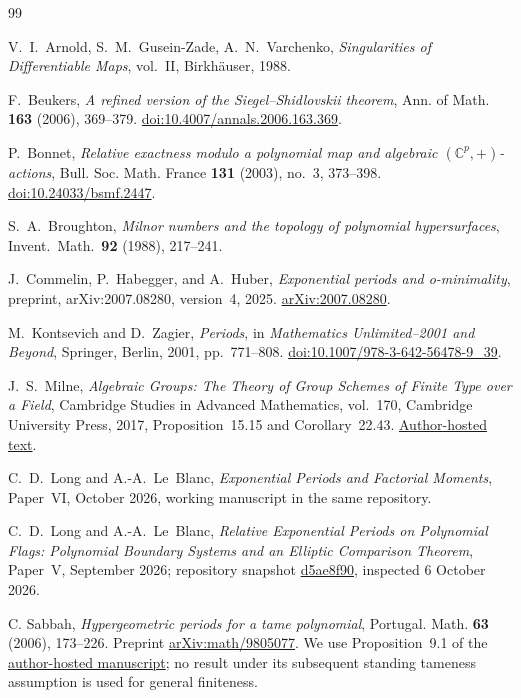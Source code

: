 \documentclass[11pt]{article}
\numberwithin{equation}{section}
\theoremstyle{definition}
\theoremstyle{remark}
\begin{document}
\small
\begin{thebibliography}{99}

 V.~I.~Arnold, S.~M.~Gusein-Zade, A.~N.~Varchenko,
 \emph{Singularities of Differentiable Maps}, vol.~II, Birkh\"auser, 1988.

 F.~Beukers,
 \emph{A refined version of the Siegel--Shidlovskii theorem}, Ann. of Math.
 \textbf{163} (2006), 369--379.
 \href{https://doi.org/10.4007/annals.2006.163.369}{doi:10.4007/annals.2006.163.369}.

 P.~Bonnet,
 \emph{Relative exactness modulo a polynomial map and algebraic
 $(\mathbb C^p,+)$-actions}, Bull. Soc. Math. France \textbf{131} (2003),
 no.~3, 373--398. \href{https://doi.org/10.24033/bsmf.2447}{doi:10.24033/bsmf.2447}.

 S.~A.~Broughton, \emph{Milnor numbers and the topology of
 polynomial hypersurfaces}, Invent.\ Math.\ \textbf{92} (1988), 217--241.

J.~Commelin, P.~Habegger, and A.~Huber,
\emph{Exponential periods and o-minimality},
preprint, arXiv:2007.08280, version~4, 2025.
\href{https://arxiv.org/abs/2007.08280}{arXiv:2007.08280}.

M.~Kontsevich and D.~Zagier,
\emph{Periods},
in \emph{Mathematics Unlimited--2001 and Beyond},
Springer, Berlin, 2001, pp.~771--808.
\href{https://doi.org/10.1007/978-3-642-56478-9_39}{doi:10.1007/978-3-642-56478-9\_39}.

J.~S.~Milne,
\emph{Algebraic Groups: The Theory of Group Schemes of Finite Type
 over a Field}, Cambridge Studies in Advanced Mathematics, vol.~170,
Cambridge University Press, 2017, Proposition~15.15 and Corollary~22.43.
\href{https://www.jmilne.org/math/Books/iAG2017.pdf}{Author-hosted text}.

 C.~D.~Long and A.-A.~Le~Blanc,
 \emph{Exponential Periods and Factorial Moments}, Paper~VI, October 2026,
 working manuscript in the same repository.

 C.~D.~Long and A.-A.~Le~Blanc,
 \emph{Relative Exponential Periods on Polynomial Flags:
 Polynomial Boundary Systems and an Elliptic Comparison Theorem},
 Paper~V, September 2026; repository snapshot
 \href{https://github.com/long-mathematics/exponential-integral-theorem/tree/d5ae8f9081c7bc34d1622316bd8463482f244395}{d5ae8f90},
 inspected 6 October 2026.

C. Sabbah, \emph{Hypergeometric periods for a tame polynomial},
Portugal. Math. \textbf{63} (2006), 173--226.
Preprint \href{https://arxiv.org/abs/math/9805077}{arXiv:math/9805077}.
We use Proposition~9.1 of the
\href{https://perso.pages.math.cnrs.fr/users/claude.sabbah/articles/sabbah_bbases.pdf}{author-hosted manuscript};
no result under its subsequent standing tameness assumption is used
for general finiteness.


\end{thebibliography}
\end{document}
